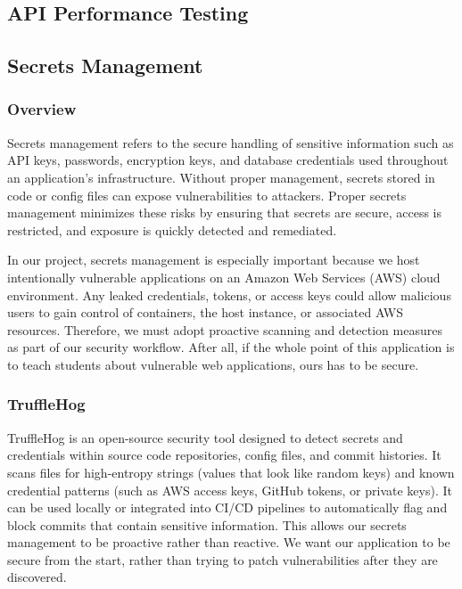 \documentclass[12pt]{article}
\begin{document}
\subsection{API Performance Testing}

\subsection{Secrets Management}

\subsubsection{Overview}
Secrets management refers to the secure handling of sensitive information such as API keys, passwords, encryption keys, and database credentials used throughout an application's infrastructure. Without proper management, secrets stored in code or config files can expose vulnerabilities to attackers. Proper secrets management minimizes these risks by ensuring that secrets are secure, access is restricted, and exposure is quickly detected and remediated. 

In our project, secrets management is especially important because we host intentionally vulnerable applications on an Amazon Web Services (AWS) cloud environment. Any leaked credentials, tokens, or access keys could allow malicious users to gain control of containers, the host instance, or associated AWS resources. Therefore, we must adopt proactive scanning and detection measures as part of our security workflow. After all, if the whole point of this application is to teach students about vulnerable web applications, ours has to be secure.

\subsubsection{TruffleHog}
TruffleHog is an open-source security tool designed to detect secrets and credentials within source code repositories, config files, and commit histories. It scans files for high-entropy strings (values that look like random keys) and known credential patterns (such as AWS access keys, GitHub tokens, or private keys). It can be used locally or integrated into CI/CD pipelines to automatically flag and block commits that contain sensitive information. This allows our secrets management to be proactive rather than reactive. We want our application to be secure from the start, rather than trying to patch vulnerabilities after they are discovered. 
\end{document}
